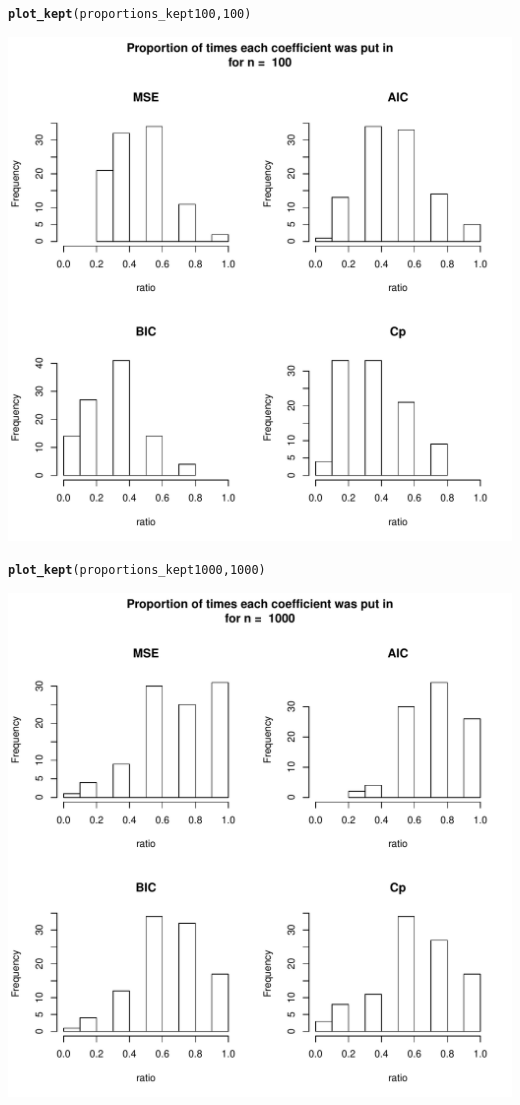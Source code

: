 \documentclass[11pt]{article}\usepackage[]{graphicx}\usepackage[]{color}
\makeatletter
\def\maxwidth{ %
  \ifdim\Gin@nat@width>\linewidth
    \linewidth
  \else
    \Gin@nat@width
  \fi
}
\newcommand{\hlnum}[1]{\textcolor[rgb]{0.686,0.059,0.569}{#1}}%
\newcommand{\hlstd}[1]{\textcolor[rgb]{0.345,0.345,0.345}{#1}}%
\newcommand{\hlkwd}[1]{\textcolor[rgb]{0.737,0.353,0.396}{\textbf{#1}}}%
\newenvironment{kframe}{%
 \def\at@end@of@kframe{}%
 \ifinner\ifhmode%
  \def\at@end@of@kframe{\end{minipage}}%
  \begin{minipage}{\columnwidth}%
 \fi\fi%
 \def\FrameCommand##1{\hskip\@totalleftmargin \hskip-\fboxsep
 \colorbox{shadecolor}{##1}\hskip-\fboxsep
     \hskip-\linewidth \hskip-\@totalleftmargin \hskip\columnwidth}%
 \MakeFramed {\advance\hsize-\width
   \@totalleftmargin\z@ \linewidth\hsize
   \@setminipage}}%
 {\par\unskip\endMakeFramed%
 \at@end@of@kframe}
\newenvironment{knitrout}{}{} %
\makeatother
\begin{document}
\begin{knitrout}
\begin{kframe}
\begin{alltt}
\hlkwd{plot_kept}\hlstd{(proportions_kept100,}\hlnum{100}\hlstd{)}
\end{alltt}
\end{kframe}
\includegraphics[width=\maxwidth]{figure/unnamed-chunk-7-1} 
\begin{kframe}\begin{alltt}
\hlkwd{plot_kept}\hlstd{(proportions_kept1000,}\hlnum{1000}\hlstd{)}
\end{alltt}
\end{kframe}
\includegraphics[width=\maxwidth]{figure/unnamed-chunk-7-2} 

\end{knitrout}
\end{document}

